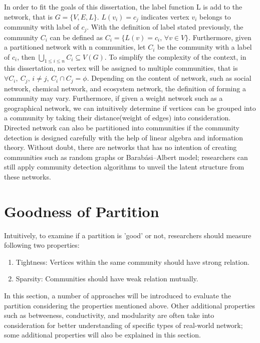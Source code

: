\documentclass[12pt]{article}
\begin{document}
In order to fit the goals of this dissertation, the label function L is add to the network, that is $G = \{V,E,L\}$. $L(v_i) = c_j$ indicates vertex $v_i$ belongs to community with label of $c_j$. With the definition of label stated previously, the community $C_i$ can be defined as $C_i = \{ L(v) = c_i \text{, } \forall v \in V \}$. Furthermore, given a partitioned network with n communities, let $C_i$ be the community with a label of $c_i$, then $\bigcup_{1 \leq i \leq n} C_i \subseteq V(G)$.  To simplify the complexity of the context, in this dissertation, no vertex will be assigned to multiple communities, that is $\forall C_i,\ C_j \text{, } i \neq j$, $C_i \cap C_j = \phi$. Depending on the content of network, such as social network, chemical network, and ecosystem network, the definition of forming a community may vary. Furthermore, if given a weight network such as a geographical network, we can intuitively determine if vertices can be grouped into a community by taking their distance(weight of edges) into consideration. Directed network can also be partitioned into communities if the community detection is designed carefully with the help of linear algebra and information theory\cite{4}. Without doubt, there are networks that has no intention of creating communities such as random graphs or Barabási–Albert model\cite{5}; researchers can still apply community detection algorithms to unveil the latent structure from these networks.

\section{Goodness of Partition}

Intuitively, to examine if a partition is 'good' or not, researchers should measure following two properties: 
\begin{enumerate}[label=(\alph*)]
\item Tightness: Vertices within the same community should have strong relation.
\item Sparsity: Communities should have weak relation mutually.
\end{enumerate}

In this section, a number of approaches will be introduced to evaluate the partition considering the properties mentioned above. Other additional properties such as betweeness, conductivity, and modularity are often take into consideration for better understanding of specific types of real-world network\cite{7,8}; some additional properties will also be explained in this section.
\end{document}
